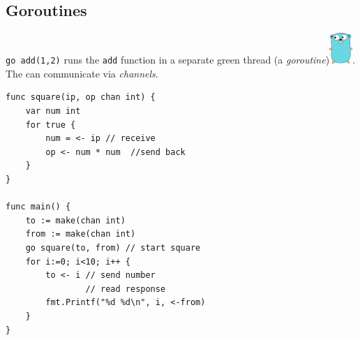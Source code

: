 \subsection{Goroutines} 

\texttt{go add(1,2)} runs the \texttt{add} function in a separate green thread (a \textit{goroutine})\includegraphics{../images/golang-small.png}. The can communicate via \emph{channels}.

\begin{lstlisting}
func square(ip, op chan int) {
	var num int
	for true {
		num = <- ip // receive
		op <- num * num  //send back
	}
}

func main() {
	to := make(chan int)
	from := make(chan int)
	go square(to, from) // start square
	for i:=0; i<10; i++ {
		to <- i // send number
                // read response
		fmt.Printf("%d %d\n", i, <-from) 
	}
}
\end{lstlisting}
